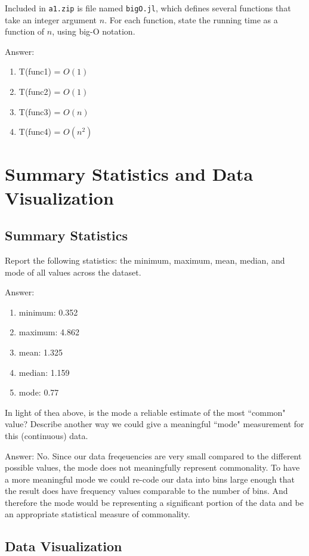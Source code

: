 \documentclass{article}
\def\ans#1{\par\gre{Answer: #1}}
\def\blu#1{{\color{blu}#1}}
\def\gre#1{{\color{gre}#1}}
\begin{document}
Included in \texttt{a1.zip} is file named \texttt{bigO.jl}, which defines several functions
that take an integer argument $n$. For each function, \blu{state the running time as a function of $n$, using big-O notation}.

\ans{
	\begin{enumerate}
		\item T(func1) = $O(1)$
		\item T(func2) = $O(1)$
		\item T(func3) = $O(n)$
		\item T(func4) = $O(n^2)$
	\end{enumerate}
}

\section{Summary Statistics and Data Visualization}

\subsection{Summary Statistics}

\blu{Report the following statistics}: the minimum, maximum, mean, median, and mode of all values across the dataset.
\ans{
	\begin{enumerate}
		\item minimum: 0.352
		\item maximum: 4.862
		\item mean: 1.325
		\item median: 1.159
		\item mode: 0.77
	\end{enumerate}
}

In light of thea above, \blu{is the mode a reliable estimate of the most ``common" value? Describe another way we could give a meaningful ``mode" measurement for this (continuous) data.}

\ans{
	No. Since our data freqeuencies are very small compared to the different possible values, the mode does not meaningfully represent commonality. To have a more meaningful mode we could re-code our data into bins large enough that the result does have frequency values comparable to the number of bins. And therefore the mode would be representing a significant portion of the data and be an appropriate statistical measure of commonality.
}

\subsection{Data Visualization}
\end{document}
